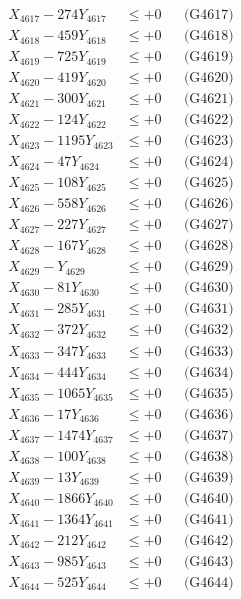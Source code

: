 \documentclass[a4paper,10pt]{article}
\begin{document}
{\begin{align}
X_{4617} - 274Y_{4617} &\leq +0 && \text{(G4617)} \\
X_{4618} - 459Y_{4618} &\leq +0 && \text{(G4618)} \\
X_{4619} - 725Y_{4619} &\leq +0 && \text{(G4619)} \\
X_{4620} - 419Y_{4620} &\leq +0 && \text{(G4620)} \\
\allowbreak
X_{4621} - 300Y_{4621} &\leq +0 && \text{(G4621)} \\
X_{4622} - 124Y_{4622} &\leq +0 && \text{(G4622)} \\
X_{4623} - 1195Y_{4623} &\leq +0 && \text{(G4623)} \\
X_{4624} - 47Y_{4624} &\leq +0 && \text{(G4624)} \\
X_{4625} - 108Y_{4625} &\leq +0 && \text{(G4625)} \\
X_{4626} - 558Y_{4626} &\leq +0 && \text{(G4626)} \\
X_{4627} - 227Y_{4627} &\leq +0 && \text{(G4627)} \\
X_{4628} - 167Y_{4628} &\leq +0 && \text{(G4628)} \\
X_{4629} - Y_{4629} &\leq +0 && \text{(G4629)} \\
X_{4630} - 81Y_{4630} &\leq +0 && \text{(G4630)} \\
\allowbreak
X_{4631} - 285Y_{4631} &\leq +0 && \text{(G4631)} \\
X_{4632} - 372Y_{4632} &\leq +0 && \text{(G4632)} \\
X_{4633} - 347Y_{4633} &\leq +0 && \text{(G4633)} \\
X_{4634} - 444Y_{4634} &\leq +0 && \text{(G4634)} \\
X_{4635} - 1065Y_{4635} &\leq +0 && \text{(G4635)} \\
X_{4636} - 17Y_{4636} &\leq +0 && \text{(G4636)} \\
X_{4637} - 1474Y_{4637} &\leq +0 && \text{(G4637)} \\
X_{4638} - 100Y_{4638} &\leq +0 && \text{(G4638)} \\
X_{4639} - 13Y_{4639} &\leq +0 && \text{(G4639)} \\
X_{4640} - 1866Y_{4640} &\leq +0 && \text{(G4640)} \\
\allowbreak
X_{4641} - 1364Y_{4641} &\leq +0 && \text{(G4641)} \\
X_{4642} - 212Y_{4642} &\leq +0 && \text{(G4642)} \\
X_{4643} - 985Y_{4643} &\leq +0 && \text{(G4643)} \\
X_{4644} - 525Y_{4644} &\leq +0 && \text{(G4644)} \\

\end{align}}
\end{document}
